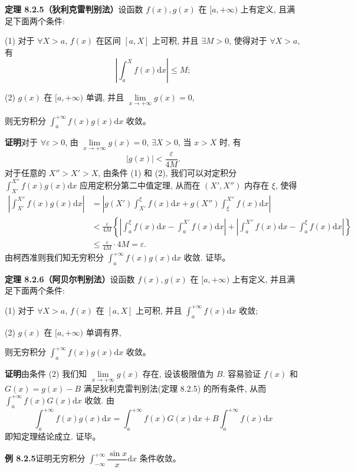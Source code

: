 \documentclass[UTF8,12pt,a4paper,fontset=fandol]{ctexart}
\begin{document}
\noindent\textbf{定理 8.2.5（狄利克雷判别法）}\quad 设函数 $f(x),g(x)$ 在 $[a,+\infty)$ 上有定义, 且满足下面两个条件:

(1) 对于 $\forall X>a$, $f(x)$ 在区间 $[a,X]$ 上可积, 并且 $\exists M>0$, 使得对于 $\forall X>a$, 有
\[
  \left|\int_a^X f(x)\mathrm dx\right|\leq M;
\]

(2) $g(x)$ 在 $[a,+\infty)$ 单调, 并且 $\lim\limits_{x\to+\infty}g(x)=0$,

则无穷积分 $\int_a^{+\infty}f(x)g(x)\mathrm dx$ 收敛。

\noindent\textbf{证明}\quad 对于 $\forall\varepsilon>0$, 由 $\lim\limits_{x\to+\infty}g(x)=0$, $\exists X>0$, 当 $x>X$ 时, 有
\[
  |g(x)|<\frac{\varepsilon}{4M}.
\]
对于任意的 $X''>X'>X$, 由条件 (1) 和 (2), 我们可以对定积分 $\int_{X'}^{X''}f(x)g(x)\mathrm dx$ 应用定积分第二中值定理, 从而在 $(X',X'')$ 内存在 $\xi$, 使得
\[
\begin{aligned}
  \left|\int_{X'}^{X''}f(x)g(x)\mathrm dx\right|
  &=
  \left|g(X')\int_{X'}^\xi f(x)\mathrm dx
  +
  g(X'')\int_\xi^{X''}f(x)\mathrm dx\right|\\
  &<
  \frac{\varepsilon}{4M}
  \left\{
  \left|\int_a^\xi f(x)\mathrm dx-\int_a^{X'}f(x)\mathrm dx\right|
  +
  \left|\int_a^{X''}f(x)\mathrm dx-\int_a^\xi f(x)\mathrm dx\right|
  \right\}\\
  &\leq \frac{\varepsilon}{4M}\cdot4M=\varepsilon.
\end{aligned}
\]
由柯西准则我们知无穷积分 $\int_a^{+\infty}f(x)g(x)\mathrm dx$ 收敛. 证毕。

\noindent\textbf{定理 8.2.6（阿贝尔判别法）}\quad 设函数 $f(x),g(x)$ 在 $[a,+\infty)$ 上有定义, 并且满足下面两个条件:

(1) 对于 $\forall X>a$, $f(x)$ 在 $[a,X]$ 上可积, 并且 $\int_a^{+\infty}f(x)\mathrm dx$ 收敛;

(2) $g(x)$ 在 $[a,+\infty)$ 单调有界,

则无穷积分 $\int_a^{+\infty}f(x)g(x)\mathrm dx$ 收敛。

\noindent\textbf{证明}\quad 由条件 (2) 我们知 $\lim\limits_{x\to+\infty}g(x)$ 存在, 设该极限值为 $B$. 容易验证 $f(x)$ 和 $G(x)=g(x)-B$ 满足狄利克雷判别法(定理 8.2.5) 的所有条件, 从而 $\int_a^{+\infty}f(x)G(x)\mathrm dx$ 收敛. 由
\[
  \int_a^{+\infty}f(x)g(x)\mathrm dx
  =
  \int_a^{+\infty}f(x)G(x)\mathrm dx
  +
  B\int_a^{+\infty}f(x)\mathrm dx
\]
即知定理结论成立. 证毕。

\noindent\textbf{例 8.2.5}\quad 证明无穷积分 $\int_{-\infty}^{+\infty}\dfrac{\sin x}{x}\mathrm dx$ 条件收敛。
\end{document}

